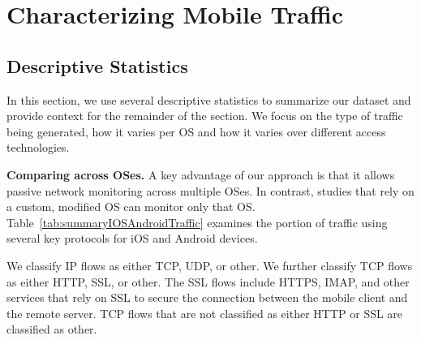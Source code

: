 \section{Characterizing Mobile Traffic}
\label{sec:measurement-results}

%

\subsection{Descriptive Statistics}
\label{sec:initial-results}

In this section, we use several descriptive statistics to 
summarize our dataset and provide context for the remainder 
of the section. We focus on the type of traffic being generated, 
how it varies per OS and how it varies over different access technologies.

\noindent\textbf{Comparing across OSes.}
A key advantage of our approach is that it allows passive network 
monitoring across multiple OSes. In contrast, studies that rely on a custom, modified 
OS can monitor only that OS.
Table~\ref{tab:summaryIOSAndroidTraffic} examines the portion of 
traffic using several key protocols for iOS and Android devices. 

We classify IP flows as either TCP, UDP, or other. We further classify TCP flows as either HTTP, SSL, or
other. The SSL flows include HTTPS, IMAP, and other services that rely
on SSL to secure the connection between the mobile client and the
remote server. TCP flows that are not classified
as either HTTP or SSL are classified as other.  


